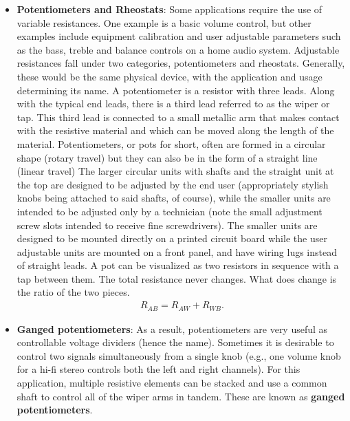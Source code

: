 \documentclass{report}
\begin{document}
\begin{itemize}
\begin{itemize}
                \item \(E_1=E_2\): the ideal circuit has zero current.
            \end{itemize}
        \item \textbf{Potentiometers and Rheostats}: Some applications require the use of variable resistances. One example is a basic volume control, but other examples include equipment calibration and user adjustable parameters such as the bass, treble and balance controls on a home audio system. Adjustable resistances fall under two categories, potentiometers and rheostats. Generally, these would be the same physical device, with the application and usage determining its name. 
            \bigbreak \noindent 
            A potentiometer is a resistor with three leads. Along with the typical end leads, there is a third lead referred to as the wiper or tap. This third lead is connected to a small metallic arm that makes contact with the resistive material and which can be moved along the length of the material. Potentiometers, or pots for short, often are formed in a circular shape (rotary travel) but they can also be in the form of a straight line (linear travel)
            \bigbreak \noindent 
            The larger circular units with shafts and the straight unit at the top are designed to be adjusted by the end user (appropriately stylish knobs being attached to said shafts, of course), while the smaller units are intended to be adjusted only by a technician (note the small adjustment screw slots intended to receive fine screwdrivers). The smaller units are designed to be mounted directly on a printed circuit board while the user adjustable units are mounted on a front panel, and have wiring lugs instead of straight leads.
            \bigbreak \noindent 
            A pot can be visualized as two resistors in sequence with a tap between them. The total resistance never changes. What does change is the ratio of the two pieces.
            \begin{align*}
                R_{AB} = R_{AW} + R_{WB}
            .\end{align*}
            \bigbreak \noindent 
            \bigbreak \noindent 
        \item \textbf{Ganged potentiometers}: As a result, potentiometers are very useful as controllable voltage dividers (hence the name). Sometimes it is desirable to control two signals simultaneously from a single knob (e.g., one volume knob for a hi-fi stereo controls both the left and right channels). For this application, multiple resistive elements can be stacked and use a common shaft to control all of the wiper arms in tandem. These are known as \textbf{ganged potentiometers}.

\end{itemize}
\end{document}
